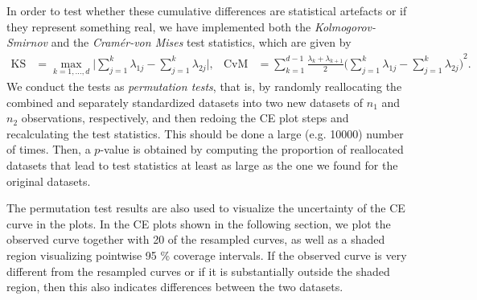 \documentclass[a4paper,14pt]{article}
\begin{document}
In order to test whether these cumulative differences are statistical artefacts or if they represent something real, we have implemented both the \emph{Kolmogorov-Smirnov} and the \emph{Cram\'er-von Mises} test statistics, which are given by
\begin{align*}
\text{KS} &= \max_{k=1,\dotsc,d} \bigg\lvert \sum_{j=1}^k \lambda_{1j} - \sum_{j=1}^k \lambda_{2j} \bigg\rvert, &
\text{CvM} &= \sum_{k=1}^{d-1} \frac{\lambda_k + \lambda_{k+1}}{2} {\bigg( \sum_{j=1}^k \lambda_{1j} - \sum_{j=1}^k \lambda_{2j} \bigg)}^2.
\end{align*}
We conduct the tests as \textit{permutation tests}, that is, by randomly reallocating the combined and separately standardized datasets into two new datasets of $n_1$ and $n_2$ observations, respectively, and then redoing the CE plot steps and recalculating the test statistics. This should be done a large (e.g. 10000) number of times. Then, a $p$-value is obtained by computing the proportion of reallocated datasets that lead to %
test statistics at least as large as %
the one we found for the original datasets.

The permutation test results are also used to visualize the uncertainty of the CE curve in the plots. In the CE plots shown in the following section, we plot the observed curve together with 20 of the resampled curves, as well as a shaded region visualizing pointwise 95 \% coverage intervals. If the observed curve is very different from the resampled curves or if it is substantially outside the shaded region, then this also indicates differences between the two datasets.
\end{document}
